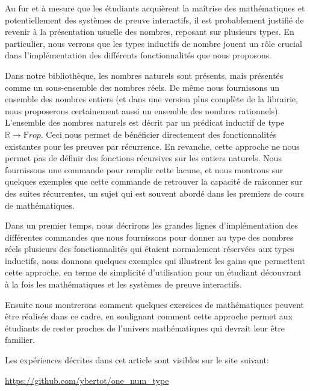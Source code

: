 \documentclass[draft]{jflart}
\begin{document}
Au fur et à mesure que les étudiants acquièrent la maîtrise des
mathématiques et potentiellement des systèmes de preuve interactifs,
il est probablement justifié de revenir à la présentation usuelle des
nombres, reposant sur plusieurs types.  En particulier, nous verrons
que les types inductifs de nombre jouent un rôle crucial dans
l'implémentation des différents fonctionnalités que nous proposons.

Dans notre bibliothèque, les nombres naturels sont présents, mais
présentés comme un sous-ensemble des nombres réels.  De même nous
fournissons un ensemble des nombres entiers (et dans une version plus
complète de la librairie, nous proposerons certainement aussi un
ensemble des nombres rationnels).  L'ensemble des nombres naturels est
décrit par un prédicat inductif de type \({\mathbb R} \rightarrow
{\mathbb Prop}\).  Ceci nous permet de bénéficier directement des
fonctionnalités existantes pour les preuves par récurrence.  En
revanche, cette approche ne nous permet pas de définir des fonctions
récursives sur les entiers naturels.  Nous fournissons une commande
pour remplir cette lacune, et nous montrons sur quelques exemples que
cette commande de retrouver la capacité de raisonner sur des suites
récurrentes, un sujet qui est souvent abordé dans les premiers de
cours de mathématiques.

Dans un premier temps, nous décrirons les grandes lignes d'implémentation des
différentes commandes que nous fournissons pour donner au type des
nombres réels plusieurs des fonctionnalités qui étaient normalement
réservées aux types inductifs, nous donnons quelques exemples qui
illustrent les gains que permettent cette approche, en terme de
simplicité d'utilisation pour un étudiant découvrant à la fois les
mathématiques et les systèmes de preuve interactifs.

Ensuite nous montrerons comment quelques exercices de mathématiques
peuvent être réalisés dans ce cadre, en soulignant comment cette
approche permet aux étudiants de rester proches de l'univers
mathématiques qui devrait leur être familier.

Les expériences décrites dans cet article sont visibles sur le site
suivant:

\url{https://github.com/ybertot/one_num_type}
\end{document}
